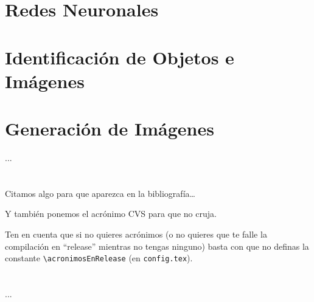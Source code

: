\section{Redes Neuronales}
\label{cap2:sec:redes-neuronales}


\section{Identificación de Objetos e Imágenes}
\label{cap2:sec:identificacion}


\section{Generación de Imágenes}
\label{cap2:sec:generacion}


...

\section*{\NotasBibliograficas}
\TocNotasBibliograficas

Citamos algo para que aparezca en la bibliografía\ldots
\citep{ldesc2e}

\medskip

Y también ponemos el acrónimo \ac{CVS} para que no cruja.

Ten en cuenta que si no quieres acrónimos (o no quieres que te falle la compilación en ``release'' mientras no tengas ninguno) basta con que no definas la constante \verb+\acronimosEnRelease+ (en \texttt{config.tex}).


\section*{\ProximoCapitulo}
\TocProximoCapitulo

...

